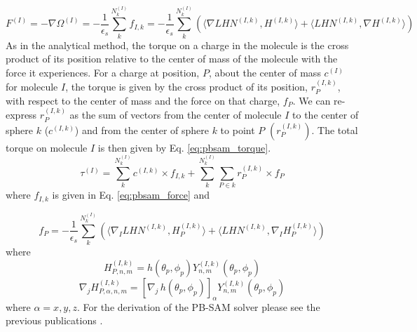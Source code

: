 \documentclass[11pt,titlepage]{article}
\begin{document}
\begin{equation}
F^{(I)} = - \nabla \Omega^{(I)} =  -  \frac{1}{\epsilon_s} \sum_{k}^{N_k^{(I)}} f_{I,k} = -  \frac{1}{\epsilon_s} \sum_{k}^{N_k^{(I)}}( \langle \nabla LHN^{(I,k)}, H^{(I,k)} \rangle +  \langle LHN^{(I,k)}, \nabla H^{(I,k)} \rangle)
\label{eq:pbsam_force}
\end{equation}
%
As in the analytical method, the torque on a charge in the molecule is the cross product of its position relative to the center of mass of the molecule with the force it experiences. For a charge at position, \(P\), about the center of mass \(c^{(I)}\) for molecule \(I\), the torque is given by the cross product of its position, \(r_P^{(I,k)}\), with respect to the center of mass and the force on that charge, $f_P$. We can re-express \(r_P^{(I,k)}\) as the sum of vectors from the center of molecule $I$ to the center of sphere \(k\) (\(c^{(I,k)}\)) and from the center of sphere \(k\) to point $P$ \((r_P^{(I,k)})\). The total torque on molecule \(I\) is then given by Eq. \ref{eq:pbsam_torque}.
%
\begin{equation}
\tau^{(I)} =  \sum_{k}^{N_k^{(I)}} c^{(I,k)} \times   f_{I,k} + \sum_{k}^{N_k^{(I)}}  \sum_{P\in k} r_P^{(I,k)} \times f_P 
\label{eq:pbsam_torque}
\end{equation}
%
where \(f_{I,k}\) is given in Eq. \ref{eq:pbsam_force} and

\begin{equation}
f_P = -  \frac{1}{\epsilon_s} \sum_{k}^{N_k^{(I)}}( \langle \nabla_I LHN^{(I,k)}, H_P^{(I,k)} \rangle +  \langle LHN^{(I,k)}, \nabla_I H_P^{(I,k)} \rangle)
\label{eq:pbsam_torque_fp}
\end{equation}
%
where
\begin{equation}
H_{P,n,m}^{(I,k)} =h(\theta_p, \phi_p) Y_{n,m}^{(I,k)} (\theta_p, \phi_p) 
\label{eq:pbsam_hp}
\end{equation}
%
\begin{equation}
\nabla_j H_{P,\alpha, n,m}^{(I,k)} = \left [ \nabla_j \, h(\theta_p, \phi_p) \right ]_{\alpha}   Y_{n,m}^{(I,k)} (\theta_p, \phi_p) 
\label{eq:pbsam_derv_hp}
\end{equation}
%
where \(\alpha = x , y, z\). For the derivation of the PB-SAM solver please see the previous publications \cite{yap2010, yap2013} .
\end{document}
